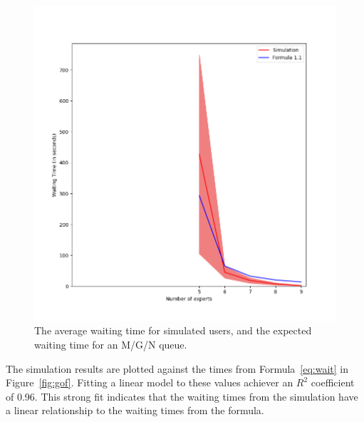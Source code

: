 \begin{figure}[H]
  \includegraphics[width=\textwidth]{figures/montecarlo/full_expected_sim.png}
  \caption{
    The average waiting time for simulated users, and the expected waiting time
    for an M/G/N queue.
  }\label{fig:full_expected_sim}
\end{figure}

The simulation results are plotted against the times from Formula~\ref{eq:wait}
in Figure~\ref{fig:gof}.
Fitting a linear model to these values achiever an $R^2$ coefficient of 0.96.
This strong fit indicates that the waiting times from the simulation have a
linear relationship to the waiting times from the formula.

